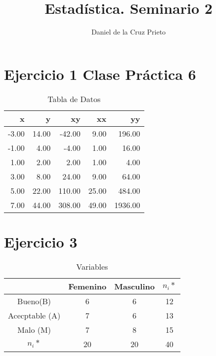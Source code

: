 \documentclass{article}
\begin{document}
	\title{Estad\'istica.  Seminario 2}
	\author{Daniel de la Cruz Prieto} 
	\maketitle
	
	\section*{Ejercicio 1 Clase Pr\'actica 6 }
	
	\begin{table}[ht]
		\centering
		\caption{Tabla de Datos}
		\begin{tabular}{rrrrr}
			\hline
			x & y & xy & xx & yy \\ 
			\hline
			-3.00 & 14.00 & -42.00 & 9.00 & 196.00 \\ 
			-1.00 & 4.00 & -4.00 & 1.00 & 16.00 \\ 
			1.00 & 2.00 & 2.00 & 1.00 & 4.00 \\ 
			3.00 & 8.00 & 24.00 & 9.00 & 64.00 \\ 
			5.00 & 22.00 & 110.00 & 25.00 & 484.00 \\ 
			\hline
			7.00 & 44.00 & 308.00 & 49.00 & 1936.00 \\ 
			\hline
		\end{tabular}
	\end{table}

	\section*{Ejercicio 3}
		\begin{table}
		\caption{Variables}
		\centering
		\begin{tabular}{|c|c|c|c|}
			\hline 
			& Femenino & Masculino & $n_{i}*$ \\
			\hline
			Bueno(B) & 6 & 6 & 12 \\
			\hline
			Acecptable (A) & 7 & 6 & 13 \\
			\hline
			Malo (M) & 7 & 8 & 15 \\
			\hline
			$n_{i}*$ & 20 & 20 & 40 \\
			\hline
		\end{tabular}
		\end{table}
\end{document}
